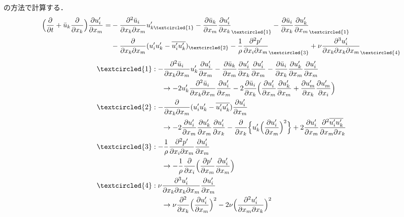 \documentclass[12pt,a4paper]{jsarticle}
\begin{document}
\cite{KidaYanase}の方法で計算する．
\begin{align*}
  \Big( \frac{\partial}{\partial t} +\bar{u}_k \frac{\partial}{\partial x_k} \Big) \frac{\partial u_i'}{\partial x_m} = &-\frac{\partial^2 \bar{u}_i}{\partial x_k \partial x_m} u_{k\textcircled{\scriptsize 1}}' -\frac{\partial \bar{u}_k}{\partial x_m} \frac{\partial u_i'}{\partial x_k}_{\textcircled{\scriptsize 1}} -\frac{\partial \bar{u}_i}{\partial x_k} \frac{\partial u_k'}{\partial x_m}_{\textcircled{\scriptsize 1}} \\
  &-\frac{\partial}{\partial x_k \partial x_m} (u_i' u_k' -\overline{u_i'u_k'})_{\textcircled{\scriptsize 2}} -\frac{1}{\rho} \frac{\partial^2 p'}{\partial x_i \partial x_m}_{\textcircled{\scriptsize 3}} +\nu \frac{\partial^3 u_i'}{\partial x_k \partial x_k \partial x_m}_{\textcircled{\scriptsize 4}}
\end{align*}
\begin{align*}
  \textcircled{\scriptsize 1} &: -\frac{\partial^2 \bar{u}_i}{\partial x_k \partial x_m} u_k' \frac{\partial u_i'}{\partial x_m} -\frac{\partial \bar{u}_k}{\partial x_m} \frac{\partial u_i'}{\partial x_k} \frac{\partial u_i'}{\partial x_m} -\frac{\partial \bar{u}_i}{\partial x_k} \frac{\partial u_k'}{\partial x_m} \frac{\partial u_i'}{\partial x_m} \\
    &~~~~ \to -2 u_k' \frac{\partial^2 \bar{u}_i}{\partial x_k \partial x_m} \frac{\partial u_i'}{\partial x_m} -2 \frac{\partial \bar{u}_i}{\partial x_k} \Big( \frac{\partial u_i'}{\partial x_m} \frac{\partial u_k'}{\partial x_m} +\frac{\partial u_m'}{\partial x_k} \frac{\partial u_m'}{\partial x_i} \Big) \\
  \textcircled{\scriptsize 2} &: -\frac{\partial}{\partial x_k \partial x_m} (u_i' u_k' -\overline{u_i'u_k'})  \frac{\partial u_i'}{\partial x_m} \\
    &~~~~ \to -2 \frac{\partial u_i'}{\partial x_m}  \frac{\partial u_k'}{\partial x_m}  \frac{\partial u_i'}{\partial x_k} - \frac{\partial}{\partial x_k} \Big\{ u_k' \Big(  \frac{\partial u_i'}{\partial x_m} \Big)^2 \Big\} +2 \frac{\partial u_i'}{\partial x_m}  \frac{\partial^2 \overline{u_i'u_k'}}{\partial x_m \partial x_k} \\
  \textcircled{\scriptsize 3} &: -\frac{1}{\rho} \frac{\partial^2 p'}{\partial x_i \partial x_m} \frac{\partial u_i'}{\partial x_m} \\
    &~~~~ \to -\frac{1}{\rho} \frac{\partial}{\partial x_i} \Big( \frac{\partial p'}{\partial x_m} \frac{\partial u_i'}{\partial x_m} \Big) \\
  \textcircled{\scriptsize 4} &: \nu \frac{\partial^3 u_i'}{\partial x_k \partial x_k \partial x_m} \frac{\partial u_i'}{\partial x_m} \\
    &~~~~ \to \nu \frac{\partial^2}{\partial x_k} \Big( \frac{\partial u_i'}{\partial x_m} \Big)^2 -2\nu \Big( \frac{\partial^2 u_i'}{\partial x_m \partial x_k} \Big)^2
\end{align*}
\end{document}
